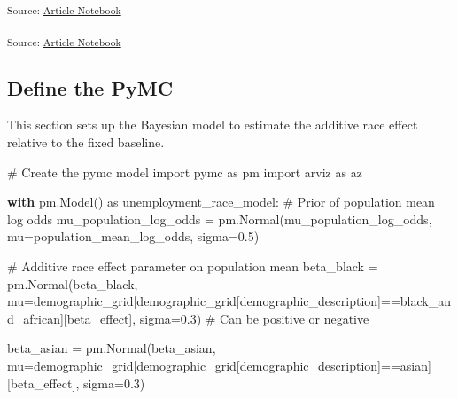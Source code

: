 \documentclass[
]{agujournal2019}
\newenvironment{Shaded}{\begin{snugshade}}{\end{snugshade}}
\newcommand{\CommentTok}[1]{\textcolor[rgb]{0.37,0.37,0.37}{#1}}
\newcommand{\ControlFlowTok}[1]{\textcolor[rgb]{0.00,0.23,0.31}{\textbf{#1}}}
\newcommand{\FloatTok}[1]{\textcolor[rgb]{0.68,0.00,0.00}{#1}}
\newcommand{\ImportTok}[1]{\textcolor[rgb]{0.00,0.46,0.62}{#1}}
\newcommand{\NormalTok}[1]{\textcolor[rgb]{0.00,0.23,0.31}{#1}}
\newcommand{\OperatorTok}[1]{\textcolor[rgb]{0.37,0.37,0.37}{#1}}
\newcommand{\StringTok}[1]{\textcolor[rgb]{0.13,0.47,0.30}{#1}}
\begin{document}
\textsubscript{Source:
\href{https://mw1296.github.io/dsan5650_social_causal_inference/index.qmd.html}{Article
Notebook}}

\textsubscript{Source:
\href{https://mw1296.github.io/dsan5650_social_causal_inference/index.qmd.html}{Article
Notebook}}

\subsection{Define the PyMC}\label{define-the-pymc}

This section sets up the Bayesian model to estimate the additive race
effect relative to the fixed baseline.

\begin{Shaded}
\begin{Highlighting}[]

\CommentTok{\# Create the pymc model}
\ImportTok{import}\NormalTok{ pymc }\ImportTok{as}\NormalTok{ pm}
\ImportTok{import}\NormalTok{ arviz }\ImportTok{as}\NormalTok{ az}

\ControlFlowTok{with}\NormalTok{ pm.Model() }\ImportTok{as}\NormalTok{ unemployment\_race\_model:}
    \CommentTok{\# Prior of population mean log odds}
\NormalTok{    mu\_population\_log\_odds }\OperatorTok{=}\NormalTok{ pm.Normal(}\StringTok{\textquotesingle{}mu\_population\_log\_odds\textquotesingle{}}\NormalTok{, mu}\OperatorTok{=}\NormalTok{population\_mean\_log\_odds, sigma}\OperatorTok{=}\FloatTok{0.5}\NormalTok{)}
    
    \CommentTok{\# Additive race effect parameter on population mean}
\NormalTok{    beta\_black }\OperatorTok{=}\NormalTok{ pm.Normal(}\StringTok{\textquotesingle{}beta\_black\textquotesingle{}}\NormalTok{, mu}\OperatorTok{=}\NormalTok{demographic\_grid[demographic\_grid[}\StringTok{\textquotesingle{}demographic\_description\textquotesingle{}}\NormalTok{]}\OperatorTok{==}\StringTok{\textquotesingle{}black\_and\_african\textquotesingle{}}\NormalTok{][}\StringTok{\textquotesingle{}beta\_effect\textquotesingle{}}\NormalTok{], sigma}\OperatorTok{=}\FloatTok{0.3}\NormalTok{) }\CommentTok{\# Can be positive or negative}

\NormalTok{    beta\_asian }\OperatorTok{=}\NormalTok{ pm.Normal(}\StringTok{\textquotesingle{}beta\_asian\textquotesingle{}}\NormalTok{, mu}\OperatorTok{=}\NormalTok{demographic\_grid[demographic\_grid[}\StringTok{\textquotesingle{}demographic\_description\textquotesingle{}}\NormalTok{]}\OperatorTok{==}\StringTok{\textquotesingle{}asian\textquotesingle{}}\NormalTok{][}\StringTok{\textquotesingle{}beta\_effect\textquotesingle{}}\NormalTok{], sigma}\OperatorTok{=}\FloatTok{0.3}\NormalTok{) }


\end{Highlighting}
\end{Shaded}
\end{document}
